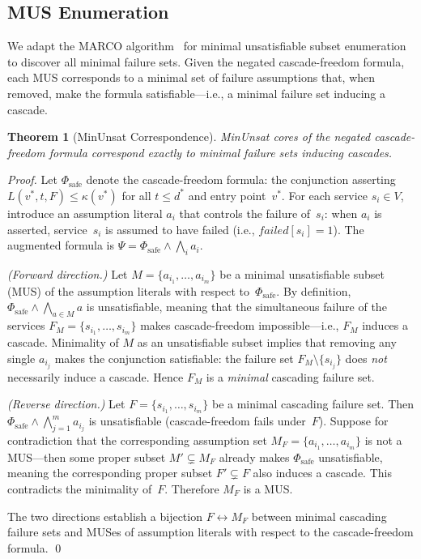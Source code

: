 \documentclass[10pt,twocolumn]{article}
\newtheorem{theorem}{Theorem}
\begin{document}
\subsection{MUS Enumeration}

We adapt the MARCO algorithm~\cite{liffiton2016marco} for minimal unsatisfiable
subset enumeration to discover all minimal failure sets. Given the negated
cascade-freedom formula, each MUS corresponds to a minimal set of failure
assumptions that, when removed, make the formula satisfiable---i.e., a minimal
failure set inducing a cascade.

\begin{theorem}[MinUnsat Correspondence]
\label{thm:mus}
MinUnsat cores of the negated cascade-freedom formula correspond exactly to
minimal failure sets inducing cascades.
\end{theorem}

\begin{proof}
Let $\Phi_{\mathrm{safe}}$ denote the cascade-freedom formula: the conjunction
asserting $L(v^*, t, F) \le \kappa(v^*)$ for all $t \le d^*$ and entry
point~$v^*$.  For each service $s_i \in V$, introduce an assumption literal
$a_i$ that controls the failure of~$s_i$: when $a_i$ is asserted, service~$s_i$
is assumed to have failed (i.e., $\mathit{failed}[s_i] = 1$).  The augmented
formula is $\Psi = \Phi_{\mathrm{safe}} \wedge \bigwedge_{i} a_i$.

\medskip\noindent\emph{(Forward direction.)}
Let $M = \{a_{i_1}, \ldots, a_{i_m}\}$ be a minimal unsatisfiable subset (MUS)
of the assumption literals with respect to~$\Phi_{\mathrm{safe}}$.  By
definition, $\Phi_{\mathrm{safe}} \wedge \bigwedge_{a \in M} a$ is
unsatisfiable, meaning that the simultaneous failure of the services
$F_M = \{s_{i_1}, \ldots, s_{i_m}\}$ makes cascade-freedom impossible---i.e.,
$F_M$ induces a cascade.  Minimality of $M$ as an unsatisfiable subset implies
that removing any single $a_{i_j}$ makes the conjunction satisfiable: the
failure set $F_M \setminus \{s_{i_j}\}$ does \emph{not} necessarily induce a
cascade. Hence $F_M$ is a \emph{minimal} cascading failure set.

\medskip\noindent\emph{(Reverse direction.)}
Let $F = \{s_{i_1}, \ldots, s_{i_m}\}$ be a minimal cascading failure set.
Then $\Phi_{\mathrm{safe}} \wedge \bigwedge_{j=1}^{m} a_{i_j}$ is
unsatisfiable (cascade-freedom fails under~$F$).  Suppose for contradiction
that the corresponding assumption set $M_F = \{a_{i_1}, \ldots, a_{i_m}\}$ is
not a MUS---then some proper subset $M' \subsetneq M_F$ already makes
$\Phi_{\mathrm{safe}}$ unsatisfiable, meaning the corresponding proper subset
$F' \subsetneq F$ also induces a cascade.  This contradicts the minimality
of~$F$.  Therefore $M_F$ is a MUS.

\medskip
The two directions establish a bijection $F \leftrightarrow M_F$ between
minimal cascading failure sets and MUSes of assumption literals with respect
to the cascade-freedom formula. \qed
\end{proof}
\end{document}

